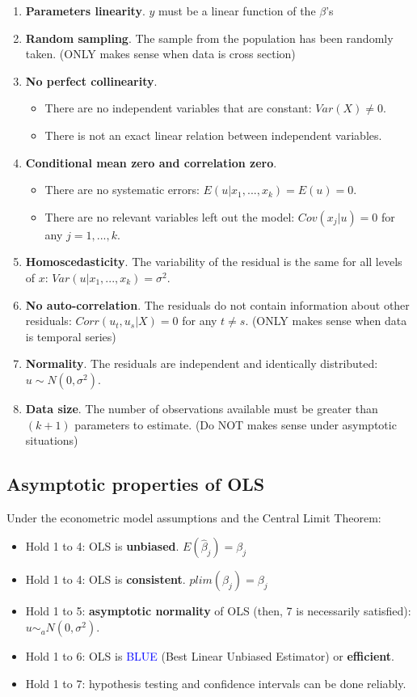 \documentclass[10pt, a4paper, landscape]{extarticle}
\begin{document}
\begin{multicols}{3}
\begin{enumerate}[leftmargin=*]
\item \textbf{Parameters linearity}. $y$ must be a linear function of the $\beta$'s
\item \textbf{Random sampling}. The sample from the population has been randomly taken. (ONLY makes sense when data is cross section)
\item \textbf{No perfect collinearity}.
\begin{itemize}[leftmargin=*]
\item There are no independent variables that are constant: $Var(X) \neq 0$.
\item There is not an exact linear relation between independent variables.
\end{itemize}
\item \textbf{Conditional mean zero and correlation zero}.
\begin{itemize}[leftmargin=*]
\item There are no systematic errors: $E(u | x_1, ..., x_k) = E(u) = 0$.
\item There are no relevant variables left out the model: $Cov(x_j | u) = 0$ for any $j = 1, ..., k$.
\end{itemize}
\item \textbf{Homoscedasticity}. The variability of the residual is the same for all levels of $x$: $Var(u | x_1, ..., x_k) = \sigma^2$.
\item \textbf{No auto-correlation}. The residuals do not contain information about other residuals: $Corr(u_t, u_s | X) = 0$ for any $t \neq s$. (ONLY makes sense when data is temporal series)
\item \textbf{Normality}. The residuals are independent and identically distributed: $u \sim N(0,\sigma^2)$.
\item \textbf{Data size}. The number of observations available must be greater than $(k + 1)$ parameters to estimate. (Do NOT makes sense under asymptotic situations)
\end{enumerate}

\subsection*{Asymptotic properties of OLS}

Under the econometric model assumptions and the Central Limit Theorem:
\begin{itemize}[leftmargin=*]
\item Hold 1 to 4: OLS is \textbf{unbiased}. $E(\hat{\beta}_j) = \beta_j$
\item Hold 1 to 4: OLS is \textbf{consistent}. $plim(\hat{\beta}_j) = \beta_j$
\item Hold 1 to 5: \textbf{asymptotic normality} of OLS (then, 7 is necessarily satisfied): $u \sim_a N(0,\sigma^2)$.
\item Hold 1 to 6: OLS is \textcolor{blue}{BLUE} (Best Linear Unbiased Estimator) or \textbf{efficient}. 
\item Hold 1 to 7: hypothesis testing and confidence intervals can be done reliably.
\end{itemize}


\end{multicols}
\end{document}
